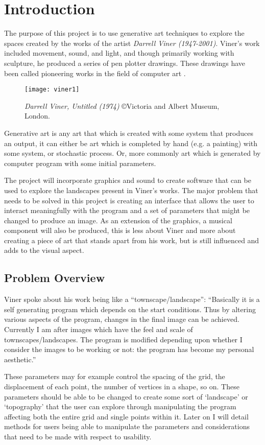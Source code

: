 \chapter{Introduction}
The purpose of this project is to use generative art techniques to explore the
spaces created by the works of the artist \emph{Darrell Viner (1947-2001)}. Viner's work
included movement, sound, and light, and though primarily working with
sculpture, he produced a series of pen plotter drawings. These drawings have
been called pioneering works in the field of computer art \citep{viner_bio}.

\begin{figure}[H]
    \texttt{[image: viner1]}
    \centering
    \caption{\emph{Darrell Viner, Untitled (1974)} \copyright Victoria and Albert Museum, London.}
\end{figure}

Generative art is any art that which is created with some system that produces
an output, it can either be art which is completed by hand (e.g. a painting)
with some system, or stochastic process. Or, more commonly art which is
generated by computer program with some initial parameters.

The project will incorporate graphics and sound to create software that can be
used to explore the landscapes present in Viner's works. The major problem that
needs to be solved in this project is creating an interface that allows the user
to interact meaningfully with the program and a set of parameters that might be
changed to produce an image. As an extension of the graphics, a musical
component will also be produced, this is less about Viner and more about
creating a piece of art that stands apart from his work, but is still influenced
and adds to the visual aspect.

\section{Problem Overview}
Viner spoke about his work being like a ``townscape/landscape'': 
``Basically it is a self generating program which depends on the start
conditions. Thus by altering various aspects of the program, changes in the
final image can be achieved. Currently I am after images which have the feel and
scale of townscapes/landscapes. The program is modified depending upon whether I
consider the images to be working or not: the program has become my personal
aesthetic.'' \cite{viner_artiststatement}

These parameters may for example control the spacing of the grid, the
displacement of each point, the number of vertices in a shape, so on. These
parameters should be able to be changed to create some sort of `landscape' or
`topography' that the user can explore through manipulating the program
affecting both the entire grid and single points within it. Later on I will
detail methods for users being able to manipulate the parameters and
considerations that need to be made with respect to usability.

